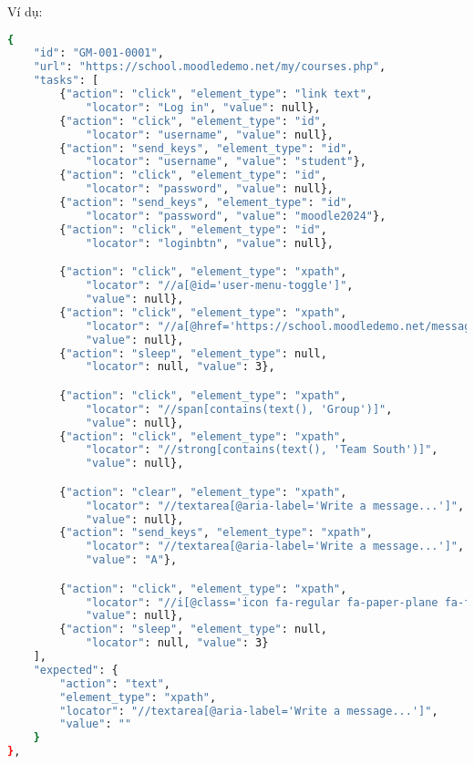 Ví dụ:

\begin{lstlisting}[language=bash, caption={Ví dụ testcase GM-001-0001 ở level 2}]
    {
    "id": "GM-001-0001",
    "url": "https://school.moodledemo.net/my/courses.php",
    "tasks": [
        {"action": "click", "element_type": "link text", 
            "locator": "Log in", "value": null},
        {"action": "click", "element_type": "id", 
            "locator": "username", "value": null},
        {"action": "send_keys", "element_type": "id", 
            "locator": "username", "value": "student"},
        {"action": "click", "element_type": "id", 
            "locator": "password", "value": null},
        {"action": "send_keys", "element_type": "id", 
            "locator": "password", "value": "moodle2024"},
        {"action": "click", "element_type": "id", 
            "locator": "loginbtn", "value": null},

        {"action": "click", "element_type": "xpath", 
            "locator": "//a[@id='user-menu-toggle']", 
            "value": null},
        {"action": "click", "element_type": "xpath", 
            "locator": "//a[@href='https://school.moodledemo.net/message/index.php']", 
            "value": null},
        {"action": "sleep", "element_type": null, 
            "locator": null, "value": 3},  

        {"action": "click", "element_type": "xpath", 
            "locator": "//span[contains(text(), 'Group')]", 
            "value": null},
        {"action": "click", "element_type": "xpath", 
            "locator": "//strong[contains(text(), 'Team South')]", 
            "value": null},

        {"action": "clear", "element_type": "xpath", 
            "locator": "//textarea[@aria-label='Write a message...']", 
            "value": null},
        {"action": "send_keys", "element_type": "xpath", 
            "locator": "//textarea[@aria-label='Write a message...']", 
            "value": "A"},

        {"action": "click", "element_type": "xpath", 
            "locator": "//i[@class='icon fa-regular fa-paper-plane fa-fw ']", 
            "value": null},
        {"action": "sleep", "element_type": null, 
            "locator": null, "value": 3}
    ],
    "expected": {
        "action": "text",
        "element_type": "xpath",
        "locator": "//textarea[@aria-label='Write a message...']",
        "value": ""
    }
},
\end{lstlisting}

